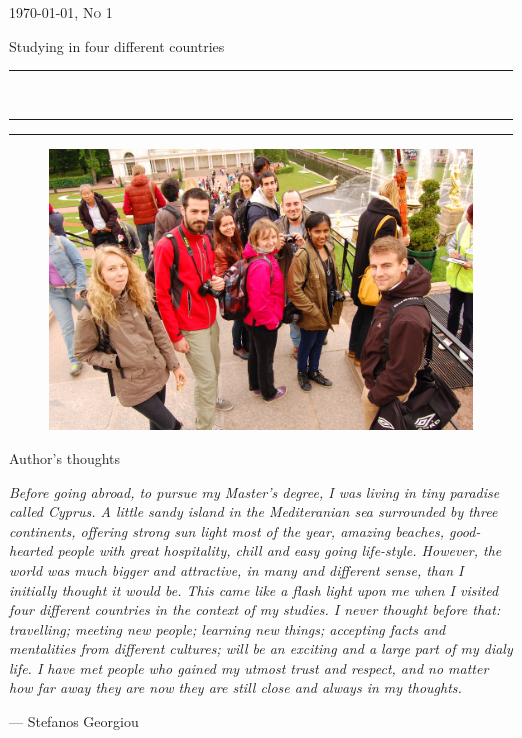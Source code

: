 \documentclass[10pt,a4paper]{article} %
\newcommand{\HorRule}[1]{\noindent\rule{\linewidth}{#1}} %
\newcommand{\SepRule}{\noindent	%
\begin{center}
\rule{250pt}{1pt} %
\end{center}
}
\newcommand{\NewsletterName}[1]{ %
\begin{center}
\Huge \usefont{T1}{fvs}{b}{n} %
#1
\end{center}	
\par \normalsize \normalfont}
\newcommand{\JournalIssue}[1]{ %
\hfill \textsc{\mydate \today, No #1} %
\par \normalsize \normalfont}
\newcommand{\NewsItem}[1]{ %
\usefont{T1}{fvs}{n}{n} %
\vspace{24pt}\large #1\vspace{3pt} %
\par \normalsize \normalfont}
\begin{document}
\JournalIssue{1} %

\NewsletterName{Studying in four different countries} %

\noindent\HorRule{3pt} \\[-0.75\baselineskip] %
\HorRule{1pt} %


\vspace{0.5cm}
\SepRule
\vspace{-0.5cm}

\begin{center}
\begin{minipage}[h]{0.75\linewidth}
\begin{figure}
\includegraphics[width=0.45 \textwidth]{media/front_picture.jpg}
\\
\end{figure}
	
\NewsItem{Author's thoughts} %
\vspace{3pt} %
\textit{
Before going abroad, to pursue my Master's degree, I was living in tiny 
paradise called Cyprus. 
A little sandy island in the Mediteranian sea surrounded by three continents, 
offering strong sun light most of the year, amazing beaches, good-hearted people 
with great hospitality, chill and easy going life-style. 
However, the world was much bigger and attractive, in many and different sense, than 
I initially thought it would be.
This came like a flash light upon me when I visited four different countries 
in the context of my studies. 
I never thought before that: travelling; meeting new people; learning new things; 
accepting facts and mentalities from different cultures; will be an exciting and 
a large part of my dialy life. 
I have met people who gained my utmost trust and respect, and no matter how far 
away they are now they are still close and always in my thoughts.   
}
\par\hfill --- Stefanos Georgiou
\end{minipage}
\end{center}
\end{document}
